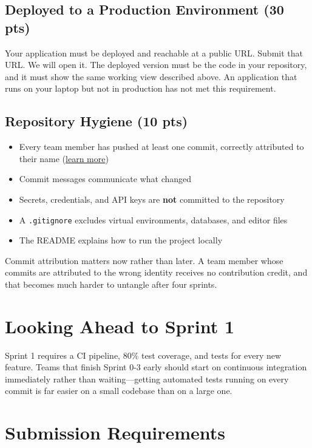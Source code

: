 \documentclass[11pt]{article}
\begin{document}
\subsection{Deployed to a Production Environment (30 pts)}
Your application must be deployed and reachable at a public URL. Submit that URL. We will open it. The deployed version must be the code in your repository, and it must show the same working view described above. An application that runs on your laptop but not in production has not met this requirement.

\subsection{Repository Hygiene (10 pts)}
\begin{itemize}
    \item Every team member has pushed at least one commit, correctly attributed to their name (\href{https://help.github.com/articles/setting-your-username-in-git/}{learn more})
    \item Commit messages communicate what changed
    \item Secrets, credentials, and API keys are \textbf{not} committed to the repository
    \item A \texttt{.gitignore} excludes virtual environments, databases, and editor files
    \item The README explains how to run the project locally
\end{itemize}

Commit attribution matters now rather than later. A team member whose commits are attributed to the wrong identity receives no contribution credit, and that becomes much harder to untangle after four sprints.

\section{Looking Ahead to Sprint 1}

Sprint 1 requires a CI pipeline, 80\% test coverage, and tests for every new feature. Teams that finish Sprint 0-3 early should start on continuous integration immediately rather than waiting---getting automated tests running on every commit is far easier on a small codebase than on a large one.

\section{Submission Requirements}
\end{document}
